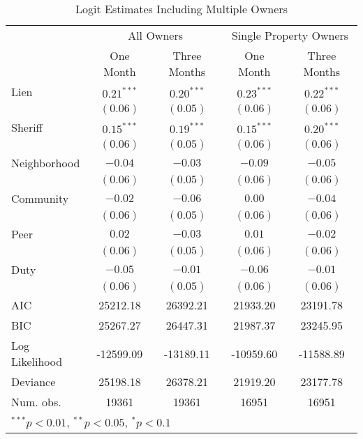 \documentclass[12pt]{article}
\begin{document}
\begin{appendix}
\begin{table}[htbp]
\caption{Logit Estimates Including Multiple Owners}
\begin{center}
\begin{tabular}{l c c c c }
\hline
 & \multicolumn{2}{c}{All Owners} & \multicolumn{2}{c}{Single Property Owners} \\
 & One Month & Three Months & One Month & Three Months \\
\hline
Lien           & $0.21^{***}$ & $0.20^{***}$ & $0.23^{***}$ & $0.22^{***}$ \\
               & $(0.06)$     & $(0.05)$     & $(0.06)$     & $(0.06)$     \\
Sheriff        & $0.15^{***}$ & $0.19^{***}$ & $0.15^{***}$ & $0.20^{***}$ \\
               & $(0.06)$     & $(0.05)$     & $(0.06)$     & $(0.06)$     \\
Neighborhood   & $-0.04$      & $-0.03$      & $-0.09$      & $-0.05$      \\
               & $(0.06)$     & $(0.05)$     & $(0.06)$     & $(0.06)$     \\
Community      & $-0.02$      & $-0.06$      & $0.00$       & $-0.04$      \\
               & $(0.06)$     & $(0.05)$     & $(0.06)$     & $(0.06)$     \\
Peer           & $0.02$       & $-0.03$      & $0.01$       & $-0.02$      \\
               & $(0.06)$     & $(0.05)$     & $(0.06)$     & $(0.06)$     \\
Duty           & $-0.05$      & $-0.01$      & $-0.06$      & $-0.01$      \\
               & $(0.06)$     & $(0.05)$     & $(0.06)$     & $(0.06)$     \\
\hline
AIC            & 25212.18     & 26392.21     & 21933.20     & 23191.78     \\
BIC            & 25267.27     & 26447.31     & 21987.37     & 23245.95     \\
Log Likelihood & -12599.09    & -13189.11    & -10959.60    & -11588.89    \\
Deviance       & 25198.18     & 26378.21     & 21919.20     & 23177.78     \\
Num. obs.      & 19361        & 19361        & 16951        & 16951        \\
\hline
\multicolumn{5}{l}{\scriptsize{$^{***}p<0.01$, $^{**}p<0.05$, $^*p<0.1$}}
\end{tabular}
\label{sh_logit_rob}
\end{center}
\end{table}


\end{appendix}
\end{document}
